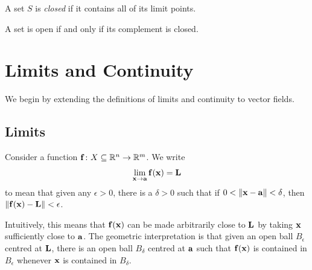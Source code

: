 \documentclass{article}
\begin{document}
\begin{definition}
  A set $S$ is \emph{closed} if it contains all of its limit points.
\end{definition}

\begin{theorem}
  A set is open if and only if its complement is closed.
\end{theorem}

\section{Limits and Continuity}

We begin by extending the definitions of limits and continuity to vector fields.

\subsection{Limits}

\begin{definition}[Limit]
  Consider a function $\mathbf{f} \colon X \subseteq \mathbb{R}^n \to \mathbb{R}^m$.
  We write
  \begin{align}
    \lim_{\mathbf{x} \to \mathbf{a}} \mathbf{f}(\mathbf{x}) = \mathbf{L}
  \end{align}
  to mean that given any $\epsilon > 0$, there is a $\delta > 0$ such that if $0 < \norm{\mathbf{x} - \mathbf{a}} < \delta$, then $\norm{\mathbf{f}(\mathbf{x}) - \mathbf{L}} < \epsilon$.
\end{definition}
Intuitively, this means that $\mathbf{f}(\mathbf{x})$ can be made arbitrarily close to $\mathbf{L}$ by taking $\mathbf{x}$ sufficiently close to $\mathbf{a}$.
The geometric interpretation is that given an open ball $B_\epsilon$ centred at $\mathbf{L}$, there is an open ball $B_\delta$ centred at $\mathbf{a}$ such that $\mathbf{f}(\mathbf{x})$ is contained in $B_\epsilon$ whenever $\mathbf{x}$ is contained in $B_\delta$.
\end{document}
